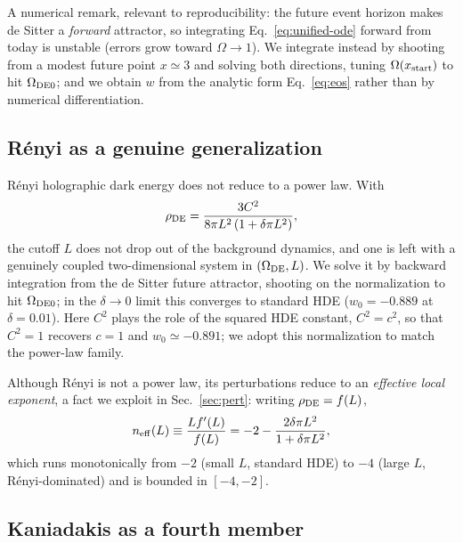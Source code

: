 \documentclass[twocolumn,10pt]{article}
\begin{document}
A numerical remark, relevant to reproducibility: the future event horizon
makes de Sitter a \emph{forward} attractor, so integrating
Eq.~\eqref{eq:unified-ode} forward from today is unstable (errors grow toward
$\Omega\to1$). We integrate instead by shooting from a modest future point
$x\simeq3$ and solving both directions, tuning $\Omega(x_{\rm start})$ to hit
$\Omega_{\rm DE0}$; and we obtain $w$ from the analytic form
Eq.~\eqref{eq:eos} rather than by numerical differentiation.

\subsection{R\'enyi as a genuine generalization}

R\'enyi holographic dark energy does not reduce to a power law. With
\begin{equation}
\rho_{\rm DE}=\frac{3C^2}{8\pi L^2\,(1+\delta\pi L^2)},
\label{eq:renyi}
\end{equation}
the cutoff $L$ does not drop out of the background dynamics, and one is left
with a genuinely coupled two-dimensional system in $(\Omega_{\rm DE},L)$. We
solve it by backward integration from the de Sitter future attractor,
shooting on the normalization to hit $\Omega_{\rm DE0}$; in the
$\delta\to0$ limit this converges to standard HDE ($w_0=-0.889$ at
$\delta=0.01$). Here $C^2$ plays the role of the squared HDE constant,
$C^2=c^2$, so that $C^2=1$ recovers $c=1$ and $w_0\simeq-0.891$; we adopt this
normalization to match the power-law family.

Although R\'enyi is not a power law, its perturbations reduce to an
\emph{effective local exponent}, a fact we exploit in
Sec.~\ref{sec:pert}: writing $\rho_{\rm DE}=f(L)$,
\begin{equation}
n_{\rm eff}(L)\equiv\frac{L f'(L)}{f(L)}=-2-\frac{2\delta\pi L^2}{1+\delta\pi L^2},
\label{eq:neff}
\end{equation}
which runs monotonically from $-2$ (small $L$, standard HDE) to $-4$
(large $L$, R\'enyi-dominated) and is bounded in $[-4,-2]$.

\subsection{Kaniadakis as a fourth member}
\label{sec:kaniadakis}
\end{document}
